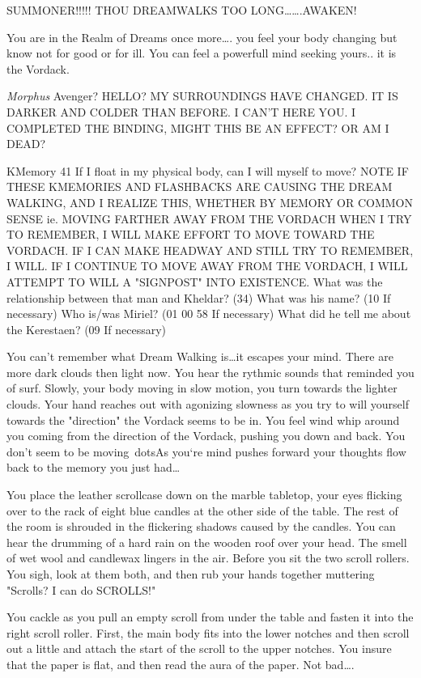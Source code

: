 {{SUMMONER!!!!! THOU DREAMWALKS TOO LONG\dots\dots.AWAKEN!

{You are in the Realm of Dreams once more\dots. you feel your body 
changing but know not for good or for ill.  You can feel a powerfull 
mind seeking yours.. it is the Vordack.}

{\em Morphus}
Avenger? HELLO? MY SURROUNDINGS HAVE CHANGED. IT IS DARKER AND 
COLDER THAN BEFORE. I CAN'T HERE YOU. I COMPLETED THE BINDING, MIGHT 
THIS BE AN EFFECT? OR AM I DEAD? 

K\-Memory 41%
If I float in my physical body, can I will myself to move?
NOTE IF THESE K\-MEMORIES AND FLASHBACKS ARE CAUSING THE DREAM WALKING, AND I REALIZE THIS, WHETHER BY MEMORY OR COMMON SENSE ie. MOVING FARTHER AWAY FROM THE VORDACH WHEN I TRY TO REMEMBER, I WILL MAKE EFFORT TO MOVE TOWARD THE VORDACH. IF I CAN MAKE HEADWAY AND STILL TRY TO REMEMBER, I WILL. IF I CONTINUE TO MOVE AWAY FROM THE VORDACH, I WILL ATTEMPT TO WILL A "SIGNPOST" INTO EXISTENCE.
What was the relationship between that man and Kheldar? (34)
What was his name?  (10  If necessary)
Who is/was Miriel?  (01 00 58  If necessary)
What did he tell me about the Kerestaen?  (09  If necessary)

You can't remember what Dream Walking is\dots it escapes your mind. 
There are more dark clouds then light now. You hear the rythmic sounds 
that reminded you of surf. Slowly, your body moving in slow motion, you 
turn towards the lighter clouds. Your hand reaches out with agonizing 
slowness as you try to will yourself towards the "direction" the Vordack 
seems to be in. You feel wind whip around you coming from the direction 
of the Vordack, pushing you down and back. You don't seem to be moving\
dotsAs you`re mind pushes forward your thoughts flow back to the memory 
you just had\dots

You place the leather scrollcase down on the marble tabletop, your eyes 
flicking over to the rack of eight blue candles at the other side of the 
table. The rest of the room is shrouded in the flickering shadows caused 
by the candles. You can hear the drumming of a hard rain on the wooden 
roof over your head. The smell of wet wool and candlewax lingers in the 
air. Before you sit the two scroll rollers. You sigh, look at them both, 
and then rub your hands together muttering "Scrolls? I can do SCROLLS!"

You cackle as you pull an empty scroll from under the table and fasten 
it into the right scroll roller. First, the main body fits into the 
lower notches and then scroll out a little and attach the start of the 
scroll to the upper notches. You insure that the paper is flat, and then 
read the aura of the paper. Not bad\dots.

}}
